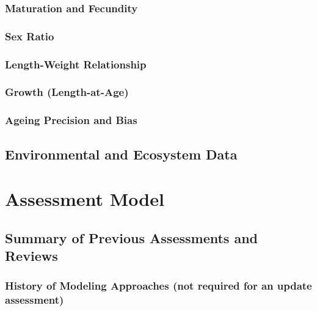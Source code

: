 \documentclass[11pt,
  letterpaper,
]{article}
\begin{document}
\hypertarget{maturation-and-fecundity}{%
\subsubsection{Maturation and Fecundity}\label{maturation-and-fecundity}}

\hypertarget{sex-ratio}{%
\subsubsection{Sex Ratio}\label{sex-ratio}}

\hypertarget{length-weight-relationship}{%
\subsubsection{Length-Weight Relationship}\label{length-weight-relationship}}

\hypertarget{growth-length-at-age}{%
\subsubsection{Growth (Length-at-Age)}\label{growth-length-at-age}}

\hypertarget{ageing-precision-and-bias}{%
\subsubsection{Ageing Precision and Bias}\label{ageing-precision-and-bias}}

\hypertarget{environmental-and-ecosystem-data}{%
\subsection{Environmental and Ecosystem Data}\label{environmental-and-ecosystem-data}}

\hypertarget{assessment-model}{%
\section{Assessment Model}\label{assessment-model}}

\hypertarget{summary-of-previous-assessments-and-reviews}{%
\subsection{Summary of Previous Assessments and Reviews}\label{summary-of-previous-assessments-and-reviews}}

\hypertarget{history-of-modeling-approaches-not-required-for-an-update-assessment}{%
\subsubsection{History of Modeling Approaches (not required for an update assessment)}\label{history-of-modeling-approaches-not-required-for-an-update-assessment}}
\end{document}
